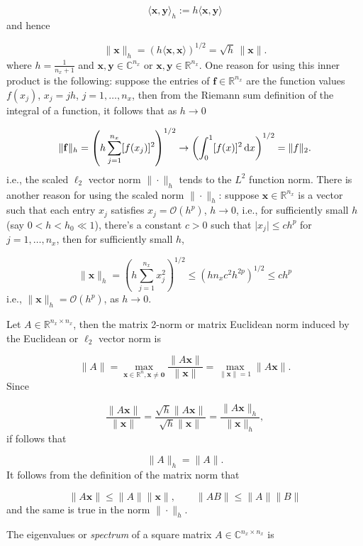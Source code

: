\documentclass[12pt,a4paper]{article}
\begin{document}
\[
\langle \mathbf{x}, \mathbf{y}\rangle_{h} := h\langle \mathbf{x}, \mathbf{y}\rangle
\]
and hence

\[
\| \mathbf{x} \|_h = \left(h\langle\mathbf{x},\mathbf{x}\rangle\right)^{1/2} = \sqrt{h}\,\| \mathbf{x}\|.
\]
where $h = \frac{1}{n_x+1}$ and $\mathbf{x}, \mathbf{y} \in \mathbb{C}^{n_x}$ or $\mathbf{x}, \mathbf{y} \in \mathbb{R}^{n_x}$.  One reason for using this inner product is the following: suppose the entries of $\mathbf{f} \in \mathbb{R}^{n_x}$ are the function values $f(x_j)$, $x_j = jh$, $j = 1, \ldots, n_x$, then from the Riemann sum definition of the integral of a function, it follows that as $h \to 0$

\[
\| \mathbf{f} \|_h = \left(h\sum_{j=1}^{n_x} [f(x_j)]^2  \right)^{1/2} \to \left( \int_0^1 [f(x)]^2 \,{\rm d}x  \right)^{1/2} = \| f\|_2.
\]
i.e., the scaled $\ell_2$ vector norm $\|\cdot \|_h$ tends to the $L^2$ function norm. There is another reason for using the scaled norm $\|\cdot \|_h$: suppose $\mathbf{x} \in \mathbb{R}^{n_x}$ is a vector such that each entry $x_j$ satisfies $x_j = \mathcal{O}(h^p)$, $h \to 0$, i.e., for sufficiently small $h$ (say $0 < h < h_0\ll 1$), there's a constant $c>0$ such that $\vert x_j \vert \leq c h^p$ for $j = 1, \ldots, n_x$, then for sufficiently small $h$,

\[
\| \mathbf{x} \|_h = \left(h\sum_{j=1}^{n_x} x_j^2  \right)^{1/2} \leq \left(hn_x c^2h^{2p}  \right)^{1/2} \leq ch^p
\]
i.e., $\| \mathbf{x} \|_h = \mathcal{O}(h^p)$, as $h \to 0$.

Let $A \in \mathbb{R}^{n_x \times n_x}$, then the matrix 2-norm or matrix Euclidean norm induced by the Euclidean or $\ell_2$ vector norm is

\[
\| A \| = \max_{\mathbf{x} \in \mathbb{R}^n, \mathbf{x}\neq \mathbf{0}} \frac{\| A\mathbf{x} \|}{\| \mathbf{x}\|} = \max_{\|\mathbf{x}\| =1} \| A\mathbf{x} \|.
\]
Since

\[
\frac{\| A\mathbf{x} \|}{\| \mathbf{x}\|} = \frac{\sqrt{h}\| A\mathbf{x} \|}{\sqrt{h}\| \mathbf{x}\|} =  \frac{\| A\mathbf{x} \|_h}{\| \mathbf{x}\|_h},
\]
if follows that 

\[
\| A \|_h = \| A \|.
\]
It follows from the definition of the matrix norm that

\[
\| A \mathbf{x}\| \leq \| A \| \| \mathbf{x} \|, \qquad \| A B\| \leq \| A\| \|B\|
\]
and the same is true in the norm $\| \cdot \|_h$.

The eigenvalues or \emph{spectrum} of a square matrix $A \in \mathbb{C}^{n_x \times n_x}$ is
\end{document}
